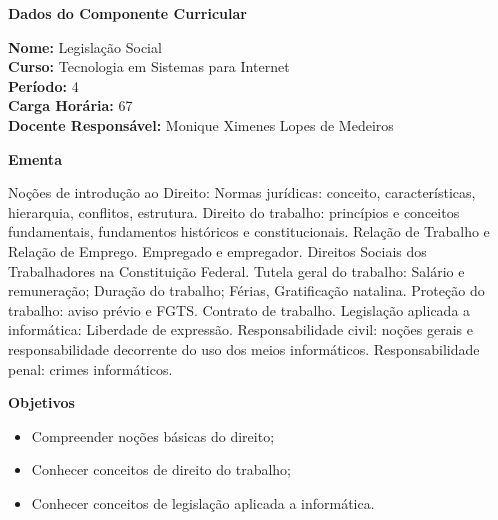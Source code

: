 

\begin{snugshade}\begin{center}\textbf{
    Dados do Componente Curricular
}\end{center}\end{snugshade}

\noindent \textbf{Nome:}                Legislação Social
\\        \textbf{Curso:}               Tecnologia em Sistemas para Internet
\\        \textbf{Período:}             \unit{4}{\degree}
\\        \textbf{Carga Horária:}       \unit{67}{\hour}
\\        \textbf{Docente Responsável:} Monique Ximenes Lopes de Medeiros


\begin{snugshade}\begin{center}\textbf{
    Ementa
\vphantom{q}}\end{center}\end{snugshade}

\noindent
Noções de introdução ao Direito: Normas jurídicas: conceito, características, hierarquia, conflitos, estrutura. Direito do trabalho: princípios e conceitos fundamentais, fundamentos históricos e constitucionais. Relação de Trabalho e Relação de Emprego. Empregado e empregador. Direitos Sociais dos Trabalhadores na Constituição Federal. Tutela geral do trabalho: Salário e remuneração; Duração do trabalho; Férias, Gratificação natalina. Proteção do trabalho: aviso prévio e FGTS. Contrato de trabalho. Legislação aplicada a informática: Liberdade de expressão. Responsabilidade civil: noções gerais e responsabilidade decorrente do uso dos meios informáticos. Responsabilidade penal: crimes informáticos. 


\begin{snugshade}\begin{center}\textbf{
    Objetivos
}\end{center}\end{snugshade}

\begin{itemize}

\item Compreender noções básicas do direito;

\item Conhecer conceitos de direito do trabalho;

\item Conhecer conceitos de legislação aplicada a informática.

\end{itemize}


